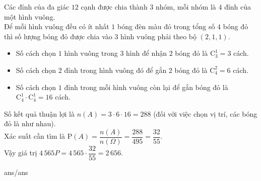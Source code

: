 \begin{ex}
{		Các đỉnh của đa giác $12$ cạnh được chia thành $3$ nhóm, mỗi nhóm là $4$ đỉnh của một hình vuông.\\
		Để mỗi hình vuông đều có ít nhất $1$ bóng đèn màu đỏ trong tổng số $4$ bóng đỏ thì số lượng bóng đỏ được chia vào $3$ hình vuông phải theo bộ $(2, 1, 1)$.
		\begin{itemize}
			\item Số cách chọn $1$ hình vuông trong $3$ hình để nhận $2$ bóng đỏ là $\mathrm{C}_3^1 = 3$ cách.
			\item Số cách chọn $2$ đỉnh trong hình vuông đó để gắn $2$ bóng đỏ là $\mathrm{C}_4^2 = 6$ cách.
			\item Số cách chọn $1$ đỉnh trong mỗi hình vuông còn lại để gắn bóng đỏ là  $\mathrm{C}_4^1 \cdot \mathrm{C}_4^1 = 16$ cách.
		\end{itemize}
		Số kết quả thuận lợi là $n(A) = 3 \cdot 6 \cdot 16 = 288$ (đối với việc chọn vị trí, các bóng đỏ là như nhau).\\
		Xác suất cần tìm là $\mathrm{P}(A)= \dfrac{n(A)}{n(\Omega)}=\dfrac{288}{495}=\dfrac{32}{55}$.\\
		Vậy giá trị $4\,565P = 4\,565 \cdot \dfrac{32}{55} = 2\,656$.
	}
\end{ex}

\begin{indapan}
	{ans/ans\currfilebase}
\end{indapan}